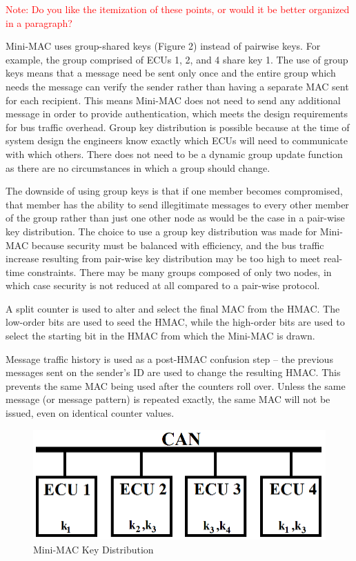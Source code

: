 \textcolor{red}{Note: Do you like the itemization of these points, or would it be better organized in a paragraph?}

Mini-MAC uses group-shared keys (Figure 2) instead of pairwise keys. For example, the group comprised of ECUs 1, 2, and 4 share key 1. The use of group keys means that a message need be sent only once and the entire group which needs the message can verify the sender rather than having a separate MAC sent for each recipient. This means Mini-MAC does not need to send any additional message in order to provide authentication, which meets the design requirements for bus traffic overhead. Group key distribution is possible because at the time of system design the engineers know exactly which ECUs will need to communicate with which others. There does not need to be a dynamic group update function as there are no circumstances in which a group should change.

The downside of using group keys is that if one member becomes compromised, that member has the ability to send illegitimate messages to every other member of the group rather than just one other node as would be the case in a pair-wise key distribution. The choice to use a group key distribution was made for Mini-MAC because security must be balanced with efficiency, and the bus traffic increase resulting from pair-wise key distribution may be too high to meet real-time constraints. There may be many groups composed of only two nodes, in which case security is not reduced at all compared to a pair-wise protocol.

A split counter is used to alter and select the final MAC from the HMAC. The low-order bits are used to seed the HMAC, while the high-order bits are used to select the starting bit in the HMAC from which the Mini-MAC is drawn.

Message traffic history is used as a post-HMAC confusion step -- the previous messages sent on the sender's ID are used to change the resulting HMAC. This prevents the same MAC being used after the counters roll over. Unless the same message (or message pattern) is repeated exactly, the same MAC will not be issued, even on identical counter values.
	
	\begin{figure}
		\centering
		\includegraphics[width=\columnwidth]{figures/key_distribution.png}
		\caption{Mini-MAC Key Distribution}
	\end{figure}
	
